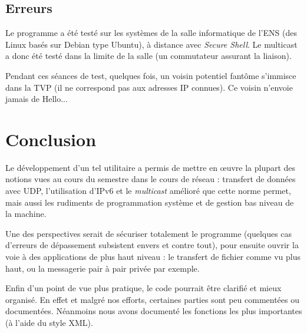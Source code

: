 \documentclass[11pt,a4paper]{article}
\begin{document}
	\subsection{Erreurs}
	
	Le programme a été testé sur les systèmes de la salle informatique de l'ENS (des Linux basés sur Debian type Ubuntu), à distance avec \emph{Secure Shell}.
	Le multicast a donc été testé dans la limite de la salle (un commutateur assurant la liaison).
	
	Pendant ces séances de test, quelques fois, un voisin potentiel fantôme s'immisce dans la TVP (il ne correspond pas aux adresses IP connues). Ce voisin n'envoie
	jamais de Hello...
	
\section{Conclusion}
	
	Le développement d'un tel utilitaire a permis de mettre en œuvre la plupart des notions vues au cours du semestre dans le cours
	de réseau : transfert de données avec UDP, l'utilisation d'IPv6 et le \emph{multicast} amélioré que cette norme permet, mais aussi les rudiments
	 de programmation système et de gestion bas niveau de la machine.
	
	Une des perspectives serait de sécuriser totalement le programme (quelques cas d'erreurs de dépassement subsistent envers et contre tout), pour ensuite
	ouvrir la voie à des applications de plus haut niveau : le transfert de fichier comme vu plus haut, ou la messagerie pair à pair privée par exemple.
	
	\medskip
	
	Enfin d'un point de vue plus pratique, le code pourrait être clarifié et mieux organisé. En effet et malgré nos efforts, certaines parties sont peu commentées
	ou documentées. Néanmoins nous avons documenté les fonctions les plus importantes (à l'aide du style XML).
\end{document}
